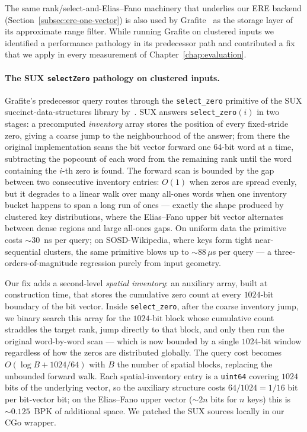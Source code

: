 The same rank/select-and-Elias--Fano machinery that underlies our ERE
backend (Section~\ref{subsec:ere-one-vector}) is also used by
Grafite~\citep{grafite2024} as the storage layer of its approximate
range filter. While running Grafite on clustered inputs we identified
a performance pathology in its predecessor path and contributed a fix
that we apply in every measurement of Chapter~\ref{chap:evaluation}.

\paragraph{The SUX \texttt{selectZero} pathology on clustered inputs.}
Grafite's predecessor query routes through the \texttt{select\_zero}
primitive of the SUX succinct-data-structures library
by~\citet{vigna2008broadword}. SUX answers \texttt{select\_zero}$(i)$
in two stages: a precomputed \emph{inventory} array stores the
position of every fixed-stride zero, giving a coarse jump to the
neighbourhood of the answer; from there the original implementation
scans the bit vector forward one 64-bit word at a time, subtracting
the popcount of each word from the remaining rank until the word
containing the $i$-th zero is found. The forward scan is bounded by
the gap between two consecutive inventory entries: $O(1)$ when zeros
are spread evenly, but it degrades to a linear walk over many
all-ones words when one inventory bucket happens to span a long run
of ones --- exactly the shape produced by clustered key
distributions, where the Elias--Fano upper bit vector alternates
between dense regions and large all-ones gaps. On uniform data the
primitive costs ${\sim}30$~ns per query; on SOSD-Wikipedia, where
keys form tight near-sequential clusters, the same primitive blows
up to ${\sim}88\,\mu$s per query --- a three-orders-of-magnitude
regression purely from input geometry.

Our fix adds a second-level \emph{spatial inventory}: an auxiliary
array, built at construction time, that stores the cumulative zero
count at every $1024$-bit boundary of the bit vector. Inside
\texttt{select\_zero}, after the coarse inventory jump, we binary
search this array for the $1024$-bit block whose cumulative count
straddles the target rank, jump directly to that block, and only
then run the original word-by-word scan --- which is now bounded by
a single $1024$-bit window regardless of how the zeros are
distributed globally. The query cost becomes $O(\log B + 1024/64)$
with $B$ the number of spatial blocks, replacing the unbounded
forward walk.
Each spatial-inventory entry is a \texttt{uint64}
covering $1024$ bits of the underlying vector, so the auxiliary
structure costs $64/1024 = 1/16$ bit per bit-vector bit; on the
Elias--Fano upper vector (${\sim}2n$ bits for $n$ keys) this is
${\sim}0.125$~BPK of additional space.
We patched the SUX sources locally in our CGo wrapper.

